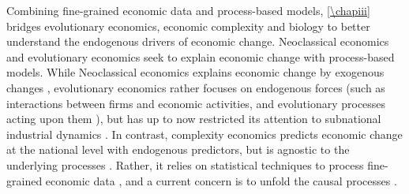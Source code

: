 % 
Combining fine-grained economic data and process-based models, \cref{\chapiii} bridges evolutionary economics, economic complexity and biology to better understand the endogenous drivers of economic change.
% 
% 
% 
Neoclassical economics and evolutionary economics seek to explain economic change with process-based models.
% 
% 
While Neoclassical economics explains economic change by exogenous changes \citep{Boschma2005a}, evolutionary economics rather focuses on endogenous forces (such as interactions between firms and economic activities, and evolutionary processes acting upon them \citep{Metcalfe2006}), but has up to now restricted its attention to subnational industrial dynamics \citep{Hodgson2019}.
% 
% 
In contrast, complexity economics predicts economic change at the national level \citep{Hidalgo2021} with endogenous predictors, but is agnostic to the underlying processes \citep{Hidalgo2021}. Rather, it relies on statistical techniques to process fine-grained economic data \citep{Mitchell}, and a current concern is to unfold the causal processes \citep{Hidalgo2021}.
% 
%

